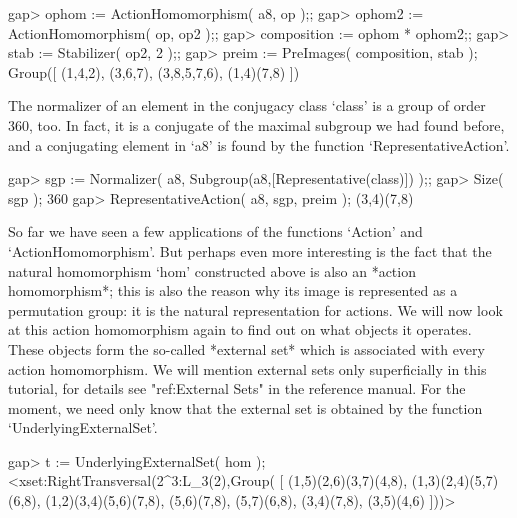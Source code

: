 \beginexample
gap> ophom := ActionHomomorphism( a8, op );;
gap> ophom2 := ActionHomomorphism( op, op2 );;
gap> composition := ophom * ophom2;;
gap> stab := Stabilizer( op2, 2 );;
gap> preim := PreImages( composition, stab );
Group([ (1,4,2), (3,6,7), (3,8,5,7,6), (1,4)(7,8) ])
\endexample

The normalizer of an element in the conjugacy class `class' is a group of
order 360, too. In fact, it is a conjugate of the maximal subgroup we had
found before, and a conjugating element in `a8'  is found by the function
`RepresentativeAction'.

\beginexample
gap> sgp := Normalizer( a8, Subgroup(a8,[Representative(class)]) );;
gap> Size( sgp );
360
gap> RepresentativeAction( a8, sgp, preim );
(3,4)(7,8)
\endexample

 
So far we have seen  a few applications  of the functions `Action' and
`ActionHomomorphism'. But perhaps even  more  interesting is the  fact
that  the  natural  homomorphism `hom'   constructed  above  is  also  an
*action  homomorphism*;  this  is also  the  reason  why its image  is
represented as a permutation group:  it is the natural representation for
actions. We will now look at this action homomorphism again to find
out on what   objects it  operates.  These  objects  form the   so-called
*external set* which is  associated with every action homomorphism. We
will  mention  external sets  only   superficially in this  tutorial, for
details see "ref:External Sets" in the  reference manual. For the moment,
we need   only know that   the external set is  obtained  by the function
`UnderlyingExternalSet'.

\beginexample
gap> t := UnderlyingExternalSet( hom );
<xset:RightTransversal(2^3:L_3(2),Group(
[ (1,5)(2,6)(3,7)(4,8), (1,3)(2,4)(5,7)(6,8), (1,2)(3,4)(5,6)(7,8), 
  (5,6)(7,8), (5,7)(6,8), (3,4)(7,8), (3,5)(4,6) ]))>
\endexample

